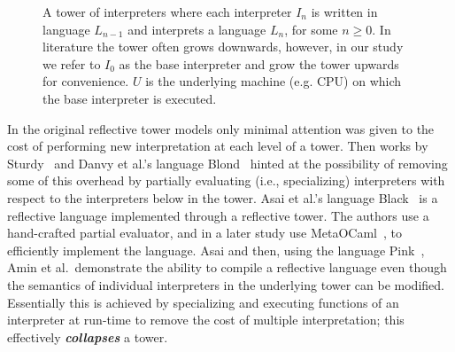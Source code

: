 \documentclass[sigplan,anonymous,review]{acmart}
\theoremstyle{definition}
\begin{document}
\begin{figure}[t]
    \centering
    \caption{A tower of interpreters where each interpreter $I_n$ is written in language $L_{n-1}$ and interprets a language $L_n$, for some $n \geq 0$. In literature the tower often grows downwards, however, in our study we refer to $I_0$ as the base interpreter and grow the tower upwards for convenience. $U$ is the underlying machine (e.g. CPU) on which the base interpreter is executed.}
    \label{fig:tombstone_tower_ex1}
\end{figure}

In the original reflective tower models only minimal attention was given to the cost of performing new interpretation at each level of a tower. Then works by Sturdy~\cite{sturdy1993lisp} and Danvy et al.'s language Blond~\cite{danvy1988intensions} hinted at the possibility of removing some of this overhead by partially evaluating (i.e., specializing) interpreters with respect to the interpreters below in the tower. Asai et al.'s language Black~\cite{asai1996duplication} is a reflective language implemented through a reflective tower. The authors use a hand-crafted partial evaluator, and in a later study use MetaOCaml~\cite{asai2015compiling}, to efficiently implement the language. Asai and then, using the language Pink~\cite{amin2017collapsing}, Amin et al.~demonstrate the ability to compile a reflective language even though the semantics of individual interpreters in the underlying tower can be modified. Essentially this is achieved by specializing and executing functions of an interpreter at run-time to remove the cost of multiple interpretation; this effectively \textbf{\textit{collapses}} a tower.
\end{document}
